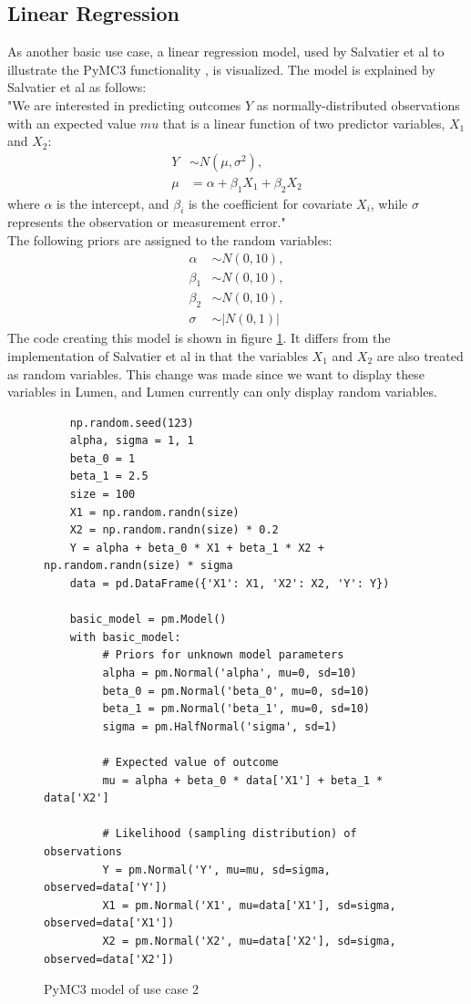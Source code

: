 \documentclass{article}
\begin{document}
\subsection{Linear Regression}
As another basic use case, a linear regression model, used by Salvatier et al to illustrate the PyMC3 functionality \cite{Salvatier2016}, is visualized. 
The model is explained by Salvatier et al as follows:\\
"We are interested in predicting outcomes $Y$ as normally-distributed observations with an expected value $mu$ that is a linear function of two predictor variables, $X_1$ and $X_2$:
\begin{equation}
\begin{split}
Y &\sim N(\mu,\sigma^2), \\
\mu &= \alpha + \beta_1 X_1 + \beta_2 X_2
\end{split}
\end{equation}
where $\alpha$ is the intercept, and $\beta_i$ is the coefficient for covariate $X_i$, while $\sigma$ represents the observation or measurement error."\\
The following priors are assigned to the random variables:
\begin{equation}
\begin{split}
\alpha &\sim N(0,10), \\
\beta_1 &\sim N(0,10), \\
\beta_2 &\sim N(0,10), \\
\sigma &\sim |N(0,1)|
\end{split}
\end{equation}
The code creating this model is shown in figure \ref{fig:code_use_case_2}. It differs from the implementation of Salvatier et al in that the variables $X_1$ and $X_2$ are also treated as random variables. This change was made since we want to display these variables in Lumen, and Lumen currently can only display random variables.
\begin{figure}[h]
	\begin{lstlisting}
	np.random.seed(123)
	alpha, sigma = 1, 1
	beta_0 = 1
	beta_1 = 2.5
	size = 100
	X1 = np.random.randn(size)
	X2 = np.random.randn(size) * 0.2
	Y = alpha + beta_0 * X1 + beta_1 * X2 + np.random.randn(size) * sigma
	data = pd.DataFrame({'X1': X1, 'X2': X2, 'Y': Y})
	
	basic_model = pm.Model()
	with basic_model:
	     # Priors for unknown model parameters
	     alpha = pm.Normal('alpha', mu=0, sd=10)
	     beta_0 = pm.Normal('beta_0', mu=0, sd=10)
	     beta_1 = pm.Normal('beta_1', mu=0, sd=10)
	     sigma = pm.HalfNormal('sigma', sd=1)
	
	     # Expected value of outcome
	     mu = alpha + beta_0 * data['X1'] + beta_1 * data['X2']
	
	     # Likelihood (sampling distribution) of observations
	     Y = pm.Normal('Y', mu=mu, sd=sigma, observed=data['Y'])
	     X1 = pm.Normal('X1', mu=data['X1'], sd=sigma, observed=data['X1'])
	     X2 = pm.Normal('X2', mu=data['X2'], sd=sigma, observed=data['X2'])
	\end{lstlisting}
	\caption[PyMC3 model of use case 2]{PyMC3 model of use case 2}
	\label{fig:code_use_case_2}
\end{figure}
\end{document}
